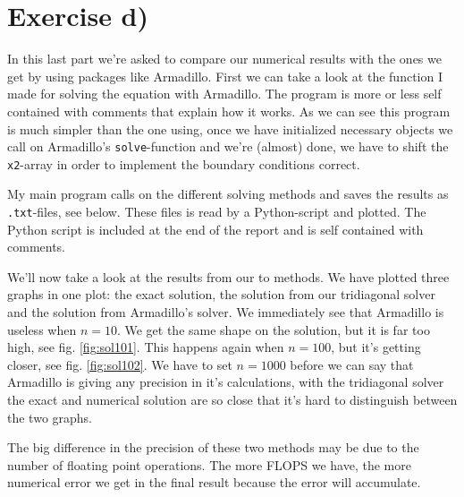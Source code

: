 \documentclass[english, 11pt]{article}
\begin{document}
\section*{Exercise d)} In this last part we're asked to compare our numerical results with the ones we get by using packages like Armadillo. First we can take a look at the function I made for solving the equation with Armadillo. The program is more or less self contained with comments that explain how it works. As we can see this program is much simpler than the one using, once we have initialized necessary objects we call on Armadillo's \verb|solve|-function and we're (almost) done, we have to shift the \verb|x2|-array in order to implement the boundary conditions correct.



My main program calls on the different solving methods and saves the results as \verb|.txt|-files, see below. These files is read by a Python-script and plotted. The Python script is included at the end of the report and is self contained with comments.



We'll now take a look at the results from our to methods. We have plotted three graphs in one plot: the exact solution, the solution from our tridiagonal solver and the solution from Armadillo's solver. We immediately see that Armadillo is useless when $n=10$. We get the same shape on the solution, but it is far too high, see fig. \ref{fig:sol101}. This happens again when $n=100$, but it's getting closer, see fig. \ref{fig:sol102}. We have to set $n=1000$ before we can say that Armadillo is giving any precision in it's calculations, with the tridiagonal solver the exact and numerical solution are so close that it's hard to distinguish between the two graphs.

The big difference in the precision of these two methods may be due to the number of floating point operations. The more FLOPS we have, the more numerical error we get in the final result because the error will accumulate.
\end{document}
